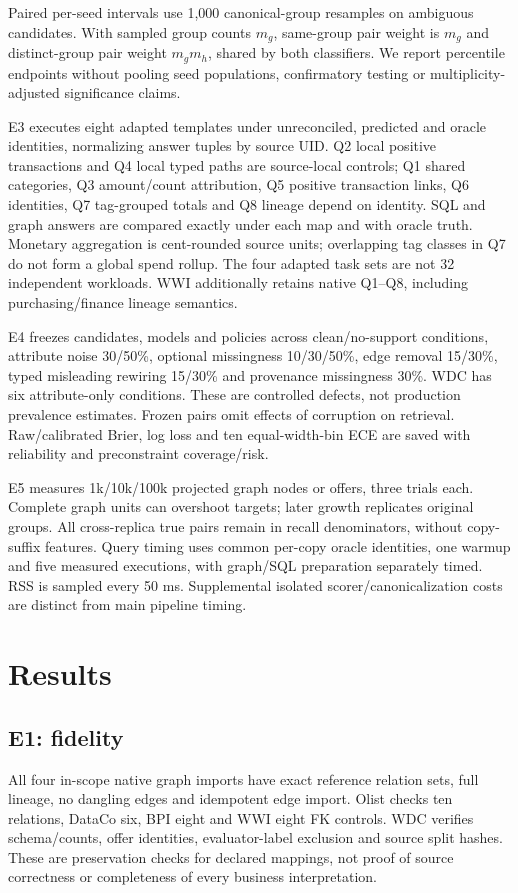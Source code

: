 \documentclass[conference,letterpaper]{IEEEtran}
\begin{document}
Paired per-seed intervals use 1,000 canonical-group resamples on ambiguous candidates. With sampled group counts $m_g$, same-group pair weight is $m_g$ and distinct-group pair weight $m_gm_h$, shared by both classifiers. We report percentile endpoints without pooling seed populations, confirmatory testing or multiplicity-adjusted significance claims.

E3 executes eight adapted templates under unreconciled, predicted and oracle identities, normalizing answer tuples by source UID. Q2 local positive transactions and Q4 local typed paths are source-local controls; Q1 shared categories, Q3 amount/count attribution, Q5 positive transaction links, Q6 identities, Q7 tag-grouped totals and Q8 lineage depend on identity. SQL and graph answers are compared exactly under each map and with oracle truth. Monetary aggregation is cent-rounded source units; overlapping tag classes in Q7 do not form a global spend rollup. The four adapted task sets are not 32 independent workloads. WWI additionally retains native Q1--Q8, including purchasing/finance lineage semantics.

E4 freezes candidates, models and policies across clean/no-support conditions, attribute noise 30/50\%, optional missingness 10/30/50\%, edge removal 15/30\%, typed misleading rewiring 15/30\% and provenance missingness 30\%. WDC has six attribute-only conditions. These are controlled defects, not production prevalence estimates. Frozen pairs omit effects of corruption on retrieval. Raw/calibrated Brier, log loss and ten equal-width-bin ECE are saved with reliability and preconstraint coverage/risk.

E5 measures 1k/10k/100k projected graph nodes or offers, three trials each. Complete graph units can overshoot targets; later growth replicates original groups. All cross-replica true pairs remain in recall denominators, without copy-suffix features. Query timing uses common per-copy oracle identities, one warmup and five measured executions, with graph/SQL preparation separately timed. RSS is sampled every 50 ms. Supplemental isolated scorer/canonicalization costs are distinct from main pipeline timing.

\section{Results}
\subsection{E1: fidelity}
All four in-scope native graph imports have exact reference relation sets, full lineage, no dangling edges and idempotent edge import. Olist checks ten relations, DataCo six, BPI eight and WWI eight FK controls. WDC verifies schema/counts, offer identities, evaluator-label exclusion and source split hashes. These are preservation checks for declared mappings, not proof of source correctness or completeness of every business interpretation.
\end{document}

